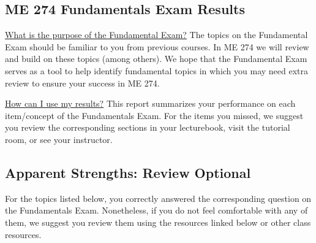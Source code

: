 \documentclass[11pt,letterpaper]{article}\usepackage[]{graphicx}\usepackage[]{color}
\begin{document}
\subsection*{ME 274 Fundamentals Exam Results}
\underline{What is the purpose of the Fundamental Exam?}  The topics on the Fundamental Exam should be familiar to you from previous courses.  In ME 274 we will review and build on these topics (among others). We hope that the Fundamental Exam serves as a tool to help identify fundamental topics in which you may need extra review to ensure your success in ME 274.\

\underline{How can I use my results?}  This report summarizes your performance on each item/concept of the Fundamentals Exam.  For the items you missed, we suggest you review the corresponding sections in your lecturebook, visit the tutorial room, or see your instructor.

\subsection*{Apparent Strengths: Review Optional}
For the topics listed below, you correctly answered the corresponding question on the Fundamentals Exam.  Nonetheless, if you do not feel comfortable with any of them, we suggest you review them using the resources linked below or other class resources.
\end{document}
